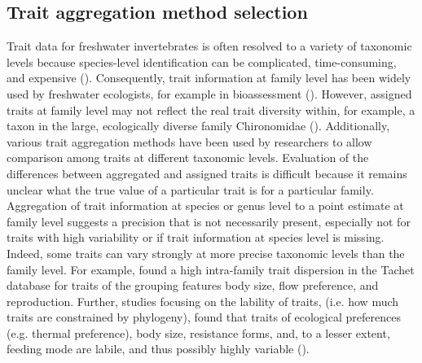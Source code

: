 \documentclass{article}
\begin{document}

\subsection*{Trait aggregation method selection}

Trait data for freshwater invertebrates is often resolved to a variety of taxonomic levels because species-level identification can be complicated, time-consuming, and expensive (\cite{marshall_taxonomic_2006, resh_which_2008}). Consequently, trait information at family level has been widely used by freshwater ecologists, for example in bioassessment (\cite{beketov_spear_2009}).
However, assigned traits at family level may not reflect the real trait diversity within, for example, a taxon in the large, ecologically diverse family Chironomidae (\cite{serra_synthesising_2016}). Additionally, various trait aggregation methods have been used by researchers to allow comparison among traits at different taxonomic levels. Evaluation of the differences between aggregated and assigned traits is difficult because it remains unclear what the true value of a particular trait is for a particular family. Aggregation of trait information at species or genus level to a point estimate at family level suggests a precision that is not necessarily present, especially not for traits with high variability or if trait information at species level is missing. Indeed, some traits can vary strongly at more precise taxonomic levels than the family level. For example, \citet{monaghan_improving_2013} found a high intra-family trait dispersion in the Tachet database for traits of the grouping features body size, flow preference, and reproduction. Further, studies focusing on the lability of traits, (i.e. how much traits are constrained by phylogeny), found that traits of ecological preferences (e.g. thermal preference), body size, resistance forms, and, to a lesser extent, feeding mode are labile, and thus possibly highly variable (\cite{poff_functional_2006, wilkes_traitbased_2020}). 
\end{document}

